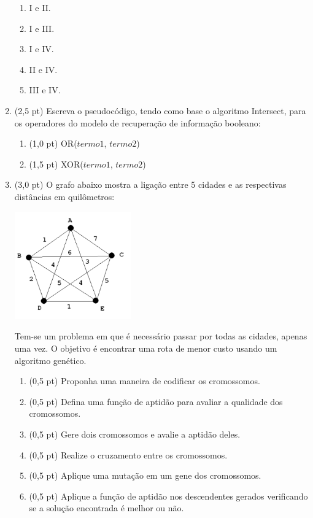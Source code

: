 \documentclass[12pt,a4paper,oneside]{article}
\begin{document}
\begin{enumerate}
	\begin{enumerate}
		\item I e II.
		\item I e III.
		\item I e IV.
		\item II e IV.
		\item III e IV.
	\end{enumerate}

	\item (2,5 pt) Escreva o pseudocódigo, tendo como base o algoritmo {\sc Intersect}, para os operadores do modelo de recuperação de informação booleano:
	\begin{enumerate}
		\item (1,0 pt) {\sc OR}($termo1$, $termo2$)
		\item (1,5 pt) {\sc XOR}($termo1$, $termo2$)
	\end{enumerate}
	
	\item (3,0 pt) O grafo abaixo mostra a ligação entre 5 cidades e as respectivas distâncias em quilômetros:
	
	\begin{center}
		\includegraphics[width=5cm]{images/fig02.png}
	\end{center}
	
	Tem-se um problema em que é necessário passar por todas as cidades, apenas uma vez. O objetivo é encontrar uma rota de menor custo usando um algoritmo genético.
	
	\begin{enumerate}
		\item (0,5 pt) Proponha uma maneira de codificar os cromossomos.
		\item (0,5 pt) Defina uma função de aptidão para avaliar a qualidade dos cromossomos.
		\item (0,5 pt) Gere dois cromossomos e avalie a aptidão deles.
		\item (0,5 pt) Realize o cruzamento entre os cromossomos.
		\item (0,5 pt) Aplique uma mutação em um gene dos cromossomos.
		\item (0,5 pt) Aplique a função de aptidão nos descendentes gerados verificando se a solução encontrada é melhor ou não.
	\end{enumerate}
	
	\end{enumerate}
\end{document}
